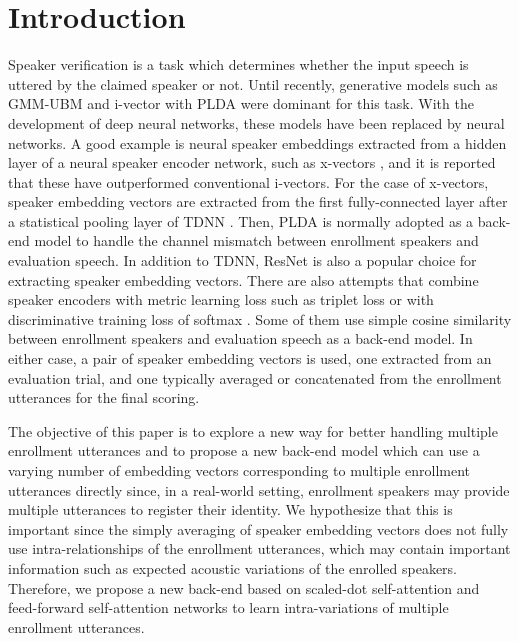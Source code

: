 \documentclass[a4paper]{article}
\begin{document}
\section{Introduction}
Speaker verification is a task which determines whether the input speech is uttered by the claimed speaker or not. 
Until recently, generative models such as GMM-UBM \cite{Reynolds2000-GMMUBM} and i-vector \cite{Dehak2010-IV} with PLDA \cite{Ioffe2006-PLDA} were dominant for this task. With the development of deep neural networks, these models have been replaced by neural networks.
A good example is neural speaker embeddings \cite{Variani2014-DV, Snyder2017-DNNE} extracted from a hidden layer of a neural speaker encoder network, such as x-vectors \cite{Snyder2018-XV, Raj2019-XVProbe}, and it is reported that these have outperformed conventional i-vectors. For the case of  x-vectors, speaker embedding vectors are extracted from the first fully-connected layer after a statistical pooling layer of TDNN \cite{Snyder2017-DNNE}. Then, PLDA is normally adopted as a back-end model to handle the channel mismatch between enrollment speakers and evaluation speech. In addition to TDNN, ResNet \cite{He2016-ResNet, Li2017-DS} is also a popular choice for extracting speaker embedding vectors.  There are also attempts that combine speaker encoders with metric learning loss such as triplet loss \cite{Li2017-DS} or with discriminative training loss of softmax \cite{Liu2017-Angular, Wang2018-AM}. Some of them use 
simple cosine similarity between enrollment speakers and evaluation speech as a back-end model. In either case, a pair of speaker embedding vectors is used, one extracted from an evaluation trial, and one typically averaged or concatenated from the enrollment utterances for the final scoring.  

The objective of this paper is to explore a new way for better handling multiple enrollment utterances and to propose a new back-end model which can use a varying number of embedding vectors corresponding to multiple enrollment utterances directly since, in a real-world setting, enrollment speakers may provide multiple utterances to register their identity. We hypothesize that this is important since the simply averaging of speaker embedding vectors does not fully use intra-relationships of the enrollment utterances, which may contain important information such as expected acoustic variations of the enrolled speakers. Therefore, we propose a new back-end based on scaled-dot self-attention and feed-forward self-attention networks to learn intra-variations of multiple enrollment utterances. 
\end{document}
